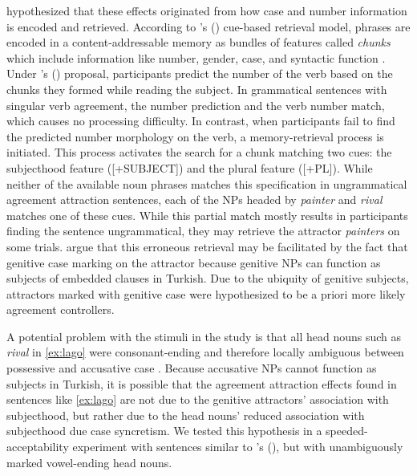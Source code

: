 \documentclass[brill,linguex]{glossa}\usepackage[]{graphicx}\usepackage[]{color}
\begin{document}
\citet{LagoEtAl:2019} hypothesized that these effects originated from how case and number information is encoded and retrieved. According to \citeauthor{LewisVasishth:2005}'s (\citeyear{LewisVasishth:2005}) cue-based retrieval model, phrases are encoded in a content-addressable memory as bundles of features called \textit{chunks} which include information like number, gender, case, and syntactic function \citep{SmithVasishth:2020}. Under \citeauthor{LagoEtAl:2019}'s (\citeyear{LagoEtAl:2019}) proposal, participants predict the number of the verb based on the chunks they formed while reading the subject. In grammatical sentences with singular verb agreement, the number prediction and the verb number match, which causes no processing difficulty. In contrast, when participants fail to find the predicted number morphology on the verb, a memory-retrieval process is initiated. This process activates the search for a chunk matching two cues: the subjecthood feature ([+SUBJECT]) and the plural feature ([+PL]). While neither of the available noun phrases matches this specification in ungrammatical agreement attraction sentences, each of the NPs headed by \textit{painter} and \textit{rival} matches one of these cues. While this partial match mostly results in participants finding the sentence ungrammatical, they may retrieve the attractor \textit{painters} on some trials. \citet{LagoEtAl:2019} argue that this erroneous retrieval may be facilitated by the fact that genitive case marking on the attractor because genitive NPs can function as subjects of embedded clauses in Turkish. Due to the ubiquity of genitive subjects, attractors marked with genitive case were hypothesized to be a priori more likely agreement controllers.

A potential problem with the stimuli in the \citet{LagoEtAl:2019} study is that all head nouns such as \textit{rival} in \ref{ex:lago} were consonant-ending and therefore locally ambiguous between possessive and accusative case \citep[66--67]{GokselKerslake:2005}. Because accusative NPs cannot function as subjects in Turkish, it is possible that the agreement attraction effects found in sentences like \ref{ex:lago} are not due to the genitive attractors' association with subjecthood, but rather due to the head nouns' reduced association with subjecthood due case syncretism. We tested this hypothesis in a speeded-acceptability experiment with sentences similar to \citeauthor{LagoEtAl:2019}'s (\citeyear{LagoEtAl:2019}), but with unambiguously marked vowel-ending head nouns.
\end{document}
